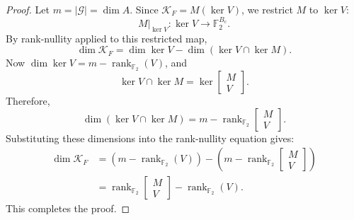 \documentclass[10pt,a4paper]{amsart}
\begin{document}
\begin{proof}
Let $m = \lvert \mathcal{G} \rvert = \dim A$. Since $\mathcal{K}_F = M(\ker V)$, we restrict $M$ to $\ker V$:
\[
M\big|_{\ker V} : \ker V \to \mathbb{F}_2^{B_{\mathrm{c}}}.
\]
By rank-nullity applied to this restricted map,
\[
\dim \mathcal{K}_F
=
\dim \ker V
-
\dim(\ker V \cap \ker M).
\]
Now $\dim \ker V = m - \operatorname{rank}_{\mathbb{F}_2}(V)$, and
\[
\ker V \cap \ker M
=
\ker\begin{bmatrix} M \\ V \end{bmatrix}.
\]
Therefore,
\[
\dim(\ker V \cap \ker M)
=
m - \operatorname{rank}_{\mathbb{F}_2}\begin{bmatrix} M \\ V \end{bmatrix}.
\]
Substituting these dimensions into the rank-nullity equation gives:
\[
\begin{aligned}
\dim \mathcal{K}_F &= (m - \operatorname{rank}_{\mathbb{F}_2}(V)) - \left(m - \operatorname{rank}_{\mathbb{F}_2}\begin{bmatrix} M \\ V \end{bmatrix}\right) \\
&= \operatorname{rank}_{\mathbb{F}_2}\begin{bmatrix} M \\ V \end{bmatrix} - \operatorname{rank}_{\mathbb{F}_2}(V).
\end{aligned}
\]
This completes the proof.
\end{proof}
\end{document}
